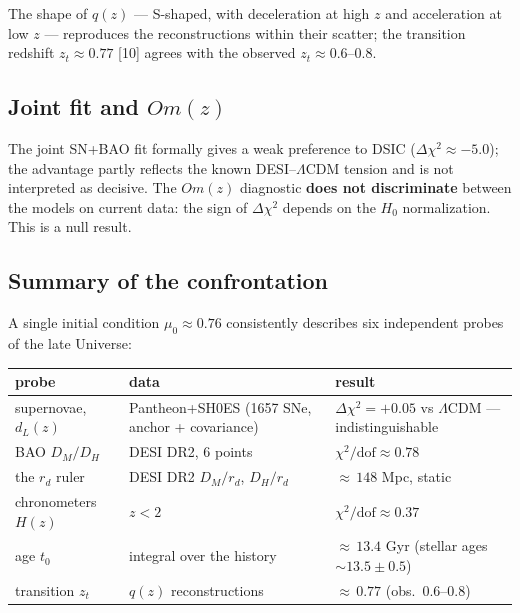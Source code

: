 \documentclass{article}
\begin{document}
The shape of $q(z)$ --- S-shaped, with deceleration at high $z$ and acceleration at low $z$ --- reproduces the reconstructions within their scatter; the transition redshift $z_t \approx 0.77$ [10] agrees with the observed $z_t \approx 0.6\text{--}0.8$.

\subsection{Joint fit and $Om(z)$}

The joint SN+BAO fit formally gives a weak preference to DSIC ($\Delta\chi^2 \approx -5.0$); the advantage partly reflects the known DESI--$\Lambda$CDM tension and is not interpreted as decisive. The $Om(z)$ diagnostic \textbf{does not discriminate} between the models on current data: the sign of $\Delta\chi^2$ depends on the $H_0$ normalization. This is a null result.

\subsection{Summary of the confrontation}

A single initial condition $\mu_0 \approx 0.76$ consistently describes six independent probes of the late Universe:

\begin{table}[htbp]
\centering
\small
\begin{tabular}{@{}p{2.6cm}p{4.0cm}p{5.2cm}@{}}
\toprule
\textbf{probe} & \textbf{data} & \textbf{result} \\
\midrule
supernovae, $d_L(z)$ & Pantheon+SH0ES (1657 SNe, anchor + covariance) & $\Delta\chi^2 = +0.05$ vs $\Lambda$CDM --- indistinguishable \\
\addlinespace
BAO $D_M/D_H$ & DESI DR2, 6 points & $\chi^2/\text{dof} \approx 0.78$ \\
\addlinespace
the $r_d$ ruler & DESI DR2 $D_M/r_d$, $D_H/r_d$ & ${\approx}\,148$ Mpc, static \\
\addlinespace
chronometers $H(z)$ & $z < 2$ & $\chi^2/\text{dof} \approx 0.37$ \\
\addlinespace
age $t_0$ & integral over the history & ${\approx}\,13.4$ Gyr (stellar ages ${\sim}13.5 \pm 0.5$) \\
\addlinespace
transition $z_t$ & $q(z)$ reconstructions & ${\approx}\,0.77$ (obs.\ $0.6\text{--}0.8$) \\
\bottomrule
\end{tabular}
\end{table}
\end{document}
